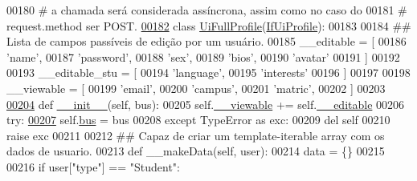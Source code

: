 \begin{DoxyCode}
00180 \textcolor{comment}{#   a chamada será considerada assíncrona, assim como no caso do}
00181 \textcolor{comment}{#   request.method ser POST.}
\hypertarget{ProfileUnit_8py_source_l00182}{}\hyperlink{classProfile_1_1ProfileUnit_1_1UiFullProfile}{00182} \textcolor{keyword}{class }\hyperlink{classProfile_1_1ProfileUnit_1_1UiFullProfile}{UiFullProfile}(\hyperlink{classProfile_1_1ProfileUnit_1_1IfUiProfile}{IfUiProfile}):
00183 
00184     \textcolor{comment}{## Lista de campos passíveis de edição por um usuário.}
00185     \_\_editable = [
00186                     \textcolor{stringliteral}{'name'},
00187                     \textcolor{stringliteral}{'password'},
00188                     \textcolor{stringliteral}{'sex'},
00189                     \textcolor{stringliteral}{'bios'},
00190                     \textcolor{stringliteral}{'avatar'}
00191                     ]
00192 
00193     \_\_editable\_stu = [
00194                     \textcolor{stringliteral}{'language'},
00195                     \textcolor{stringliteral}{'interests'}
00196                     ]
00197 
00198     \_\_viewable = [
00199                     \textcolor{stringliteral}{'email'},
00200                     \textcolor{stringliteral}{'campus'},
00201                     \textcolor{stringliteral}{'matric'},
00202                     ]
00203 
\hypertarget{ProfileUnit_8py_source_l00204}{}\hyperlink{classProfile_1_1ProfileUnit_1_1UiFullProfile_adf6a5ba4144b085d75c938def4c1374a}{00204}     \textcolor{keyword}{def }\hyperlink{classProfile_1_1ProfileUnit_1_1UiFullProfile_adf6a5ba4144b085d75c938def4c1374a}{\_\_init\_\_}(self, bus):
00205         self.\hyperlink{classProfile_1_1ProfileUnit_1_1UiFullProfile_a92a8fe9852ca9a15af9f0b3b1f7f3475}{\_\_viewable} += self.\hyperlink{classProfile_1_1ProfileUnit_1_1UiFullProfile_ad83bd84ca790c9c849a29ff074848bd4}{\_\_editable}
00206         \textcolor{keywordflow}{try}:
\hypertarget{ProfileUnit_8py_source_l00207}{}\hyperlink{classProfile_1_1ProfileUnit_1_1UiFullProfile_a47049f3f61c7fada93dd84fccd19a2bd}{00207}             self.\hyperlink{classProfile_1_1ProfileUnit_1_1IfUiProfile_a32a87d193e5d14e0ff3125d6bab2c420}{bus} = bus
00208         \textcolor{keywordflow}{except} TypeError \textcolor{keyword}{as} exc:
00209             del self
00210             \textcolor{keywordflow}{raise} exc
00211 
00212     \textcolor{comment}{##  Capaz de criar um template-iterable array com os dados de usuario.}
00213     \textcolor{keyword}{def }\_\_makeData(self, user):
00214         data = \{\}
00215 
00216         \textcolor{keywordflow}{if} user[\textcolor{stringliteral}{"type"}] == \textcolor{stringliteral}{"Student"}:

\end{DoxyCode}
